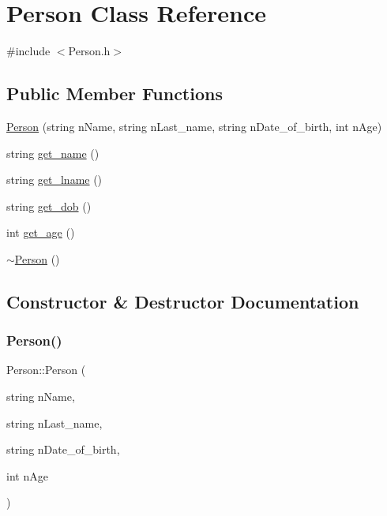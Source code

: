 \hypertarget{class_person}{}\section{Person Class Reference}
\label{class_person}


{\ttfamily \#include $<$Person.\+h$>$}

\subsection*{Public Member Functions}
\begin{DoxyCompactItemize}
\item 
\mbox{\hyperlink{class_person_a089232f8e0982be78e4235afb5525edb}{Person}} (string n\+Name, string n\+Last\+\_\+name, string n\+Date\+\_\+of\+\_\+birth, int n\+Age)
\item 
string \mbox{\hyperlink{class_person_a0c69dd4500c6d730aae6605d664c11c9}{get\+\_\+name}} ()
\item 
string \mbox{\hyperlink{class_person_ae05a6813f3c340299a20b0b15f963212}{get\+\_\+lname}} ()
\item 
string \mbox{\hyperlink{class_person_aa0c0ebc67c37d68b05ef16c8e0aa3223}{get\+\_\+dob}} ()
\item 
int \mbox{\hyperlink{class_person_aca80d4f361d5ea23619ccddfdc393ad4}{get\+\_\+age}} ()
\item 
\mbox{\hyperlink{class_person_a700ffd693321c5fe6880262acf43d4da}{$\sim$\+Person}} ()
\end{DoxyCompactItemize}


\subsection{Constructor \& Destructor Documentation}
\mbox{\label{class_person_a089232f8e0982be78e4235afb5525edb}} 
\subsubsection{\texorpdfstring{Person()}{Person()}}
{\footnotesize\ttfamily Person\+::\+Person (\begin{DoxyParamCaption}\item[{string}]{n\+Name,  }\item[{string}]{n\+Last\+\_\+name,  }\item[{string}]{n\+Date\+\_\+of\+\_\+birth,  }\item[{int}]{n\+Age }\end{DoxyParamCaption})}

